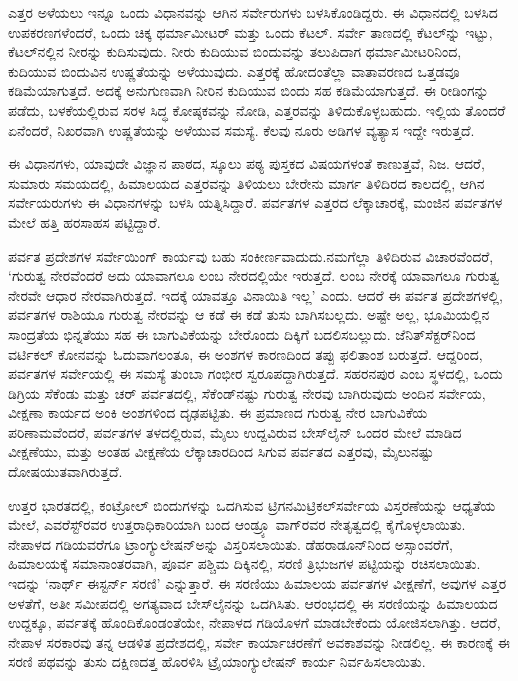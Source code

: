 \vskip 3pt

ಎತ್ತರ ಅಳೆಯಲು ಇನ್ನೂ ಒಂದು ವಿಧಾನವನ್ನು ಆಗಿನ ಸರ್ವೇರುಗಳು ಬಳಸಿಕೊಂಡಿದ್ದರು. ಈ ವಿಧಾನದಲ್ಲಿ ಬಳಸಿದ ಉಪಕರಣಗಳೆಂದರೆ, ಒಂದು ಚಿಕ್ಕ ಥರ್ಮಾಮೀಟರ್​ ಮತ್ತು ಒಂದು ಕೆಟಲ್​. ಸರ್ವೇ ತಾಣದಲ್ಲಿ ಕೆಟಲ್​ನ್ನು ಇಟ್ಟು, ಕೆಟಲ್​ನಲ್ಲಿನ ನೀರನ್ನು ಕುದಿಸುವುದು. ನೀರು ಕುದಿಯುವ ಬಿಂದುವನ್ನು ತಲುಪಿದಾಗ ಥರ್ಮಾಮೀಟರಿನಿಂದ, ಕುದಿಯುವ ಬಿಂದುವಿನ ಉಷ್ಣತೆಯನ್ನು ಅಳೆಯುವುದು. ಎತ್ತರಕ್ಕೆ ಹೋದಂತೆಲ್ಲಾ ವಾತಾವರಣದ ಒತ್ತಡವೂ ಕಡಿಮೆಯಾಗುತ್ತದೆ. ಅದಕ್ಕೆ ಅನುಗುಣವಾಗಿ ನೀರಿನ ಕುದಿಯುವ ಬಿಂದು ಸಹ ಕಡಿಮೆಯಾಗುತ್ತದೆ. ಈ ರೀಡಿಂಗನ್ನು ಪಡೆದು, ಬಳಕೆಯಲ್ಲಿರುವ ಸರಳ ಸಿದ್ಧ ಕೋಷ್ಠಕವನ್ನು ನೋಡಿ, ಎತ್ತರವನ್ನು ತಿಳಿದುಕೊಳ್ಳಬಹುದು. ಇಲ್ಲಿಯ ತೊಂದರೆ ಏನೆಂದರೆ, ನಿಖರವಾಗಿ ಉಷ್ಣತೆಯನ್ನು ಅಳೆಯುವ ಸಮಸ್ಯೆ. ಕೆಲವು ನೂರು ಅಡಿಗಳ ವ್ಯತ್ಯಾಸ ಇದ್ದೇ ಇರುತ್ತದೆ.

\newpage

ಈ ವಿಧಾನಗಳು, ಯಾವುದೇ ವಿಜ್ಞಾನ ಪಾಠದ, ಸ್ಕೂಲು ಪಠ್ಯ ಪುಸ್ತಕದ ವಿಷಯಗಳಂತೆ ಕಾಣುತ್ತವೆ, ನಿಜ. ಆದರೆ, ಸುಮಾರು  ಸಮಯದಲ್ಲಿ, ಹಿಮಾಲಯದ ಎತ್ತರವನ್ನು ತಿಳಿಯಲು ಬೇರೇನು ಮಾರ್ಗ ತಿಳಿದಿರದ ಕಾಲದಲ್ಲಿ, ಆಗಿನ ಸರ್ವೇಯರುಗಳು ಈ ವಿಧಾನಗಳನ್ನು ಬಳಸಿ ಯತ್ನಿಸಿದ್ದಾರೆ. ಪರ್ವತಗಳ ಎತ್ತರದ ಲೆಕ್ಕಾಚಾರಕ್ಕೆ, ಮಂಜಿನ ಪರ್ವತಗಳ ಮೇಲೆ ಹತ್ತಿ ಹರಸಾಹಸ ಪಟ್ಟಿದ್ದಾರೆ.

\vskip 5pt

ಪರ್ವತ ಪ್ರದೇಶಗಳ ಸರ್ವೇಯಿಂಗ್​ ಕಾರ್ಯವು ಬಹು ಸಂಕೀರ್ಣವಾದುದು.\break ನಮಗೆಲ್ಲಾ ತಿಳಿದಿರುವ ವಿಚಾರವೆಂದರೆ, ‘ಗುರುತ್ವ ನೇರವೆಂದರೆ ಅದು ಯಾವಾಗಲೂ ಲಂಬ ನೇರದಲ್ಲಿಯೇ ಇರುತ್ತದೆ. ಲಂಬ ನೇರಕ್ಕೆ ಯಾವಾಗಲೂ ಗುರುತ್ವ ನೇರವೇ ಆಧಾರ ನೇರವಾಗಿರುತ್ತದೆ. ಇದಕ್ಕೆ ಯಾವತ್ತೂ ವಿನಾಯಿತಿ ಇಲ್ಲ’ ಎಂದು. ಆದರೆ ಈ ಪರ್ವತ ಪ್ರದೇಶಗಳಲ್ಲಿ, ಪರ್ವತಗಳ ರಾಶಿಯೂ ಗುರುತ್ವ ನೇರವನ್ನು ಆ ಕಡೆ ಈ ಕಡೆ ತುಸು ಬಾಗಿಸಬಲ್ಲದು. ಅಷ್ಟೇ ಅಲ್ಲ, ಭೂಮಿಯಲ್ಲಿನ ಸಾಂದ್ರತೆಯ ಭಿನ್ನತೆಯು ಸಹ ಈ ಬಾಗುವಿಕೆಯನ್ನು ಬೇರೊಂದು ದಿಕ್ಕಿಗೆ ಬದಲಿಸಬಲ್ಲುದು. ಜೆನಿತ್​ ಸೆಕ್ಟರ್​ನಿಂದ ವರ್ಟಿಕಲ್​ ಕೋನವನ್ನು ಓದುವಾಗಲಂತೂ, ಈ ಅಂಶಗಳ ಕಾರಣದಿಂದ ತಪ್ಪು ಫಲಿತಾಂಶ ಬರುತ್ತದೆ. ಆದ್ದರಿಂದ, ಪರ್ವತಗಳ ಸರ್ವೇಯಲ್ಲಿ ಈ ಸಮಸ್ಯೆ ತುಂಬಾ ಗಂಭೀರ ಸ್ವರೂಪದ್ದಾಗಿರುತ್ತದೆ. ಸಹರನಪುರ ಎಂಬ ಸ್ಥಳದಲ್ಲಿ, ಒಂದು ಡಿಗ್ರಿಯ  ಸೆಕೆಂಡು ಮತ್ತು ಚರ್​ ಪರ್ವತದಲ್ಲಿ,  ಸೆಕೆಂಡ್​ನಷ್ಟು ಗುರುತ್ವ ನೇರವು ಬಾಗಿರುವುದು ಅಂದಿನ ಸರ್ವೇಯ, ವೀಕ್ಷಣಾ ಕಾರ್ಯದ ಅಂಕಿ ಅಂಶಗಳಿಂದ ದೃಢಪಟ್ಟಿತು. ಈ ಪ್ರಮಾಣದ ಗುರುತ್ವ ನೇರ ಬಾಗುವಿಕೆಯ ಪರಿಣಾಮವೆಂದರೆ, ಪರ್ವತಗಳ ತಳದಲ್ಲಿರುವ,  ಮೈಲು ಉದ್ದವಿರುವ ಬೇಸ್​ಲೈನ್​ ಒಂದರ ಮೇಲೆ ಮಾಡಿದ ವೀಕ್ಷಣೆಯು, ಮತ್ತು ಅಂತಹ ವೀಕ್ಷಣೆಯ ಲೆಕ್ಕಾಚಾರದಿಂದ ಸಿಗುವ ಪರ್ವತದ ಎತ್ತರವು,  ಮೈಲುನಷ್ಟು ದೋಷಯುತವಾಗಿರುತ್ತದೆ.

\vskip 5pt

ಉತ್ತರ ಭಾರತದಲ್ಲಿ, ಕಂಟ್ರೋಲ್​ ಬಿಂದುಗಳನ್ನು ಒದಗಿಸುವ ಟ್ರಿಗನಮಿಟ್ರಿಕಲ್​\break ಸರ್ವೇಯ ವಿಸ್ತರಣೆಯನ್ನು ಆಧ್ಯತೆಯ ಮೇಲೆ, ಎವರೆಸ್ಟ್​ರವರ ಉತ್ತರಾಧಿಕಾರಿಯಾಗಿ ಬಂದ ಆಂಡ್ರ್ಯೂ ವಾಗ್​ರವರ ನೇತೃತ್ವದಲ್ಲಿ ಕೈಗೊಳ್ಳಲಾಯಿತು. ನೇಪಾಳದ ಗಡಿಯವರೆಗೂ ಟ್ರಾಂಗ್ಯುಲೇಷನ್​ಅನ್ನು ವಿಸ್ತರಿಸಲಾಯಿತು. ಡೆಹರಾಡೂನ್​ನಿಂದ ಅಸ್ಸಾಂವರೆಗೆ, ಹಿಮಾಲಯಕ್ಕೆ ಸಮಾನಾಂತರವಾಗಿ, ಪೂರ್ವ ಪಶ್ಚಿಮ ದಿಕ್ಕಿನಲ್ಲಿ, ಸರಣಿ ತ್ರಿಭುಜಗಳ ಪಟ್ಟಿಯನ್ನು ರಚಿಸಲಾಯಿತು. ಇದನ್ನು ‘ನಾರ್ಥ್ ಈಸ್ಟರ್ನ್ ಸರಣಿ’ ಎನ್ನುತ್ತಾರೆ. ಈ ಸರಣಿಯು ಹಿಮಾಲಯ ಪರ್ವತಗಳ ವೀಕ್ಷಣೆಗೆ, ಅವುಗಳ ಎತ್ತರ ಅಳತೆಗೆ, ಅತೀ ಸಮೀಪದಲ್ಲಿ ಅಗತ್ಯವಾದ ಬೇಸ್‌ಲೈನನ್ನು ಒದಗಿಸಿತು. ಆರಂಭದಲ್ಲಿ ಈ ಸರಣಿಯನ್ನು ಹಿಮಾಲಯದ ಉದ್ದಕ್ಕೂ, ಪರ್ವತಕ್ಕೆ ಹೊಂದಿಕೊಂಡಂತೆಯೇ, ನೇಪಾಳದ ಗಡಿಯೊಳಗೆ ಮಾಡಬೇಕೆಂದು ಯೋಜಿಸಲಾಗಿತ್ತು. ಆದರೆ, ನೇಪಾಳ ಸರಕಾರವು ತನ್ನ ಆಡಳಿತ ಪ್ರದೇಶದಲ್ಲಿ, ಸರ್ವೇ ಕಾರ್ಯಾಚರಣೆಗೆ ಅವಕಾಶವನ್ನು ನೀಡಲಿಲ್ಲ. ಈ ಕಾರಣಕ್ಕೆ ಈ ಸರಣಿ ಪಥವನ್ನು ತುಸು ದಕ್ಷಿಣದತ್ತ ಹೊರಳಿಸಿ ಟ್ರೈಯಾಂಗ್ಯುಲೇಷನ್​ ಕಾರ್ಯ ನಿರ್ವಹಿಸಲಾಯಿತು.

